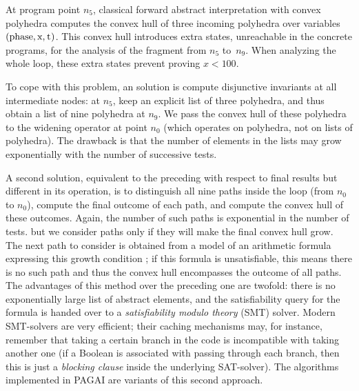 \documentclass{entcs}
\begin{document}
At program point $n_5$, classical forward abstract interpretation with convex polyhedra computes the convex hull of three incoming polyhedra over variables $(\lstinline|phase|,\lstinline|x|,\lstinline|t|)$. This convex hull introduces extra states, unreachable in the concrete programs, for the analysis of the fragment from $n_5$ to~$n_9$. When analyzing the whole loop, these extra states prevent proving $x < 100$.

To cope with this problem, an solution is compute disjunctive invariants at all intermediate nodes: at $n_5$, keep an explicit list of three polyhedra, and thus obtain a list of nine polyhedra at $n_9$. We pass the convex hull of these polyhedra to the widening operator at point $n_0$ (which operates on polyhedra, not on lists of polyhedra). The drawback is that the number of elements in the lists may grow exponentially with the number of successive tests.

A second solution, equivalent to the preceding with respect to final results but different in its operation, is to distinguish all nine paths inside the loop (from $n_0$ to $n_0$), compute the final outcome of each path, and compute the convex hull of these outcomes.
Again, the number of such paths is exponential in the number of tests.
but we consider paths only if they will make the final convex hull grow.
The next path to consider is obtained from a model of an arithmetic formula expressing this growth condition \cite{Monniaux_Gonnord_SAS11}; if this formula is unsatisfiable, this means there is no such path and thus the convex hull encompasses the outcome of all paths.
The advantages of this method over the preceding one are twofold: there is no exponentially large list of abstract elements, and the satisfiability query for the formula is handed over to a \emph{satisfiability modulo theory} (SMT) solver.
Modern SMT-solvers are very efficient; their caching mechanisms may, for instance, remember that taking a certain branch in the code is incompatible with taking another one (if a Boolean is associated with passing through each branch, then this is just a \emph{blocking clause} inside the underlying SAT-solver).
The algorithms implemented in PAGAI are variants of this second approach.
\end{document}
